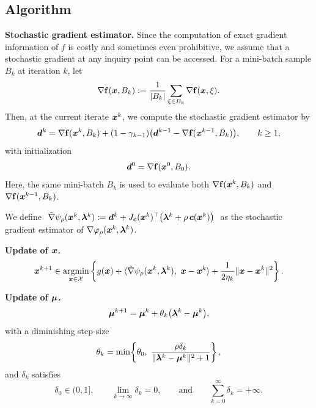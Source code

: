 \documentclass[10pt]{article}
\begin{document}
\subsection{Algorithm}

\textbf{Stochastic gradient estimator.}
Since the computation of exact gradient information of $f$ is costly and sometimes even prohibitive, we assume that a stochastic gradient at any inquiry point can be accessed. For a mini-batch sample $B_k$ at iteration $k$, let
\[
\nabla \mathbf{f}(\bm{x},B_k)
:=
\frac{1}{|B_k|}\sum_{\xi \in B_k} \nabla \mathbf{f}(\bm{x},\xi).
\]
Then, at the current iterate $\bm{x}^k$, we compute the stochastic gradient estimator by
\begin{equation}\label{eq:storm}
    \bm{d}^k
    =
    \nabla \mathbf{f}(\bm{x}^k, B_k)
    + (1-\gamma_{k-1})
    \big(
        \bm{d}^{k-1}
        - \nabla \mathbf{f}(\bm{x}^{k-1}, B_k)
    \big),
    \qquad k \geq 1,
\end{equation}
with initialization
\begin{equation}\label{eq:storm-init}
    \bm{d}^0 = \nabla \mathbf{f}(\bm{x}^0,B_0).
\end{equation}
Here, the same mini-batch $B_k$ is used to evaluate both
$\nabla \mathbf{f}(\bm{x}^k,B_k)$ and
$\nabla \mathbf{f}(\bm{x}^{k-1},B_k)$.

We define \(\ \tilde{\nabla} \psi_{\rho}(\bm{x}^k, \bm{\lambda}^k) := \bm{d}^k + J_{\bm{c}}(\bm{x}^k)^\top\!\left(\bm{\lambda}^k + \rho\,\bm{c}(\bm{x}^k)\right)\ \) as the stochastic gradient estimator of $\nabla \varphi_{\rho}(\bm{x}^k, \bm{\lambda}^k)$.    

\textbf{Update of $\bm{x}$.}
\begin{equation}\label{eq:x-update}
\bm{x}^{k+1} \in \operatorname*{\mathrm{argmin}}_{\bm{x} \in \mathcal{X}}
\left\{
g(\bm{x}) + \langle \tilde{\nabla} \psi_{\rho}(\bm{x}^k, \bm{\lambda}^k),\ \bm{x} - \bm{x}^k \rangle + \frac{1}{2\eta_k}\|\bm{x} - \bm{x}^k\|^2
\right\}.
\end{equation}

\textbf{Update of $\bm{\mu}$.}
\begin{equation}\label{eq:mu-update}
    \bm{\mu}^{k+1} = \bm{\mu}^k + \theta_k\big(\bm{\lambda}^k - \bm{\mu}^k\big),
\end{equation} with a diminishing step-size
\begin{equation}\label{eq:theta-def}
    \theta_k = \min\!\left\{\theta_0,\; 
    \frac{\rho\delta_k}{\|\bm{\lambda}^k - \bm{\mu}^k\|^2 + 1}\right\},
\end{equation} and \(\delta_k \) satisfies
\begin{equation}\label{eq:delta-conditions}
    \delta_0 \in (0,1], \qquad 
    \lim_{k\to\infty} \delta_k = 0, \qquad \text{and} \qquad
    \sum_{k=0}^{\infty} \delta_k = +\infty.
\end{equation}
\end{document}
